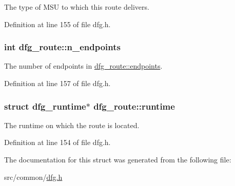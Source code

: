 The type of M\-S\-U to which this route delivers. 



Definition at line 155 of file dfg.\-h.

\hypertarget{structdfg__route_aa8015cd7ca3c4400e88120e0af74fc99}{
\subsubsection[{n\-\_\-endpoints}]{\setlength{\rightskip}{0pt plus 5cm}int dfg\-\_\-route\-::n\-\_\-endpoints}}\label{structdfg__route_aa8015cd7ca3c4400e88120e0af74fc99}


The number of endpoints in \hyperlink{structdfg__route_a6e4febfc25853befadf7dc64de1b7cff}{dfg\-\_\-route\-::endpoints}. 



Definition at line 157 of file dfg.\-h.

\hypertarget{structdfg__route_a07ec2a43f3078fc9fe4b8cc1ab0339b3}{
\subsubsection[{runtime}]{\setlength{\rightskip}{0pt plus 5cm}struct {\bf dfg\-\_\-runtime}$\ast$ dfg\-\_\-route\-::runtime}}\label{structdfg__route_a07ec2a43f3078fc9fe4b8cc1ab0339b3}


The runtime on which the route is located. 



Definition at line 154 of file dfg.\-h.



The documentation for this struct was generated from the following file\-:\begin{DoxyCompactItemize}
\item 
src/common/\hyperlink{dfg_8h}{dfg.\-h}\end{DoxyCompactItemize}
